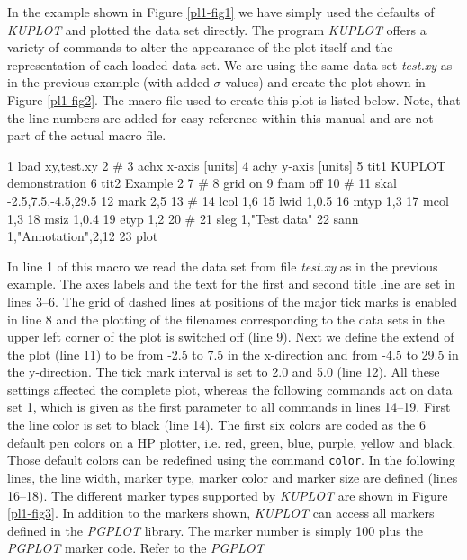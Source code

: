 In the example shown in Figure \ref{pl1-fig1} we have simply used
the defaults of {\it KUPLOT} and plotted the data set directly. The
program {\it KUPLOT} offers a variety of commands to alter the
appearance of the plot itself and the representation of each loaded
data set. We are using the same data set {\it test.xy} as in the
previous example (with added $\sigma$ values) and create the plot
shown in Figure \ref{pl1-fig2}. The macro file used to create this
plot is listed below. Note, that the line numbers are added for easy
reference within this manual and are not part of the actual macro
file.
%
\begin{MacVerbatim}
      1  load xy,test.xy
      2  #
      3  achx x-axis [units]
      4  achy y-axis [units]
      5  tit1 \fs KUPLOT demonstration
      6  tit2 Example 2
      7  #
      8  grid on
      9  fnam off
     10  #
     11  skal -2.5,7.5,-4.5,29.5
     12  mark 2,5
     13  #
     14  lcol 1,6
     15  lwid 1,0.5
     16  mtyp 1,3
     17  mcol 1,3
     18  msiz 1,0.4
     19  etyp 1,2
     20  #
     21  sleg 1,"Test data"
     22  sann 1,"Annotation",2,12
     23  plot
\end{MacVerbatim}
%
In line 1 of this macro we read the data set from file {\it test.xy}
as in the previous example.  The axes labels and the text for the
first and second title line are set in lines 3--6. The grid of
dashed lines at positions of the major tick marks is enabled in line
8 and the plotting of the filenames corresponding to the data sets
in the upper left corner of the plot is switched off (line 9). Next
we define the extend of the plot (line 11) to be from -2.5 to 7.5 in
the x-direction and from -4.5 to 29.5 in the y-direction. The tick
mark interval is set to 2.0 and 5.0 (line 12). All these settings
affected the complete plot, whereas the following commands act on
data set 1, which is given as the first parameter to all commands in
lines 14--19.  First the line color is set to black (line 14).  The
first six colors are coded as the 6 default pen colors on a HP
plotter, i.e.  red, green, blue, purple, yellow and black. Those
default colors can be redefined using the command {\tt color}.  In
the following lines, the line width, marker type, marker color and
marker size are defined (lines 16--18).  The different marker types
supported by {\it KUPLOT} are shown in Figure \ref{pl1-fig3}. In
addition to the markers shown, {\it KUPLOT} can access all markers
defined in the {\it PGPLOT} library. The marker number is simply 100
plus the {\it PGPLOT} marker code. Refer to the {\it PGPLOT}
